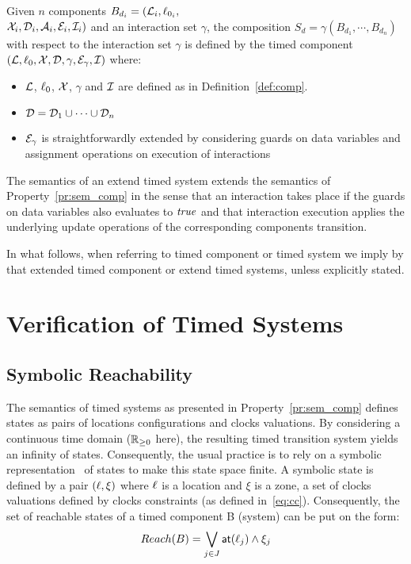 \begin{definition}
  Given $n$ components $B_{d_i}=(\mathcal{L}_i,\ell_{0_i},$\\$\mathcal{X}_i,\mathcal{D}_i,\mathcal{A}_i,
  \mathcal{E}_i,\mathcal{I}_i)$ and an interaction set $\gamma$,
  the composition $S_d=\gamma(B_{d_1},\cdots,B_{d_n})$ with respect to 
  the interaction set $\gamma$ is defined by the timed component 
  $(\mathcal{L},\ell_0,\mathcal{X},\mathcal{D},\gamma,\mathcal{E}_{\gamma},\mathcal{I})$ where:
  \begin{itemize}
    \item $\mathcal{L}$, $\ell_0$, $\mathcal{X}$, $\gamma$ and $\mathcal{I}$ are defined as
      in Definition~\ref{def:comp}.
    \item $\mathcal{D}=\mathcal{D}_1\cup\cdots\cup\mathcal{D}_n$
    \item $\mathcal{E}_{\gamma}$ is straightforwardly extended by considering guards
      on data variables and assignment operations on execution of interactions
  \end{itemize}
\end{definition}
The semantics of an extend timed system extends the semantics of Property~\ref{pr:sem_comp}
in the sense that an interaction takes place if the guards on data variables also evaluates
to $\textnormal{\textit{true}}$ and that interaction execution applies the underlying update operations of the
corresponding components transition.

In what follows, when referring to timed component or timed system we imply by that 
extended timed component or extend timed systems, unless explicitly stated. 

\section{Verification of Timed Systems}\label{sec:2.4}
\subsection{Symbolic Reachability}

The semantics of timed systems as presented in Property~\ref{pr:sem_comp} 
defines states as pairs of locations configurations and clocks
valuations. By considering a continuous time domain ($\mathbb{R}_{\ge 0}$ here), the 
resulting timed transition system yields an infinity of states.
Consequently, the usual practice is to rely on a symbolic representation~\cite{}
of states to make this state space finite.
A symbolic state is defined by a pair $(\ell,\xi)$ where $\ell$ is a location
and $\xi$ is a zone, a set of clocks valuations defined by clocks constraints
(as defined in~\ref{eq:cc}). Consequently, the set of reachable states of a 
timed component B (system) can be put on the form:
\begin{displaymath}
  Reach(B)=\bigvee_{j\in{J}}\textsf{at}(\ell_j)\wedge\xi_j
\end{displaymath}

